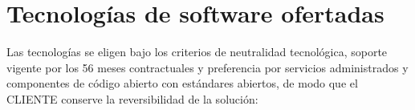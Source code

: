
\chapter{Tecnologías de software ofertadas}
\label{sec:b-tecnologias-de-software-ofertadas}

Las tecnologías se eligen bajo los criterios de neutralidad tecnológica, soporte vigente por los 56 meses contractuales y preferencia por servicios administrados y componentes de código abierto con estándares abiertos, de modo que el CLIENTE conserve la reversibilidad de la solución:

